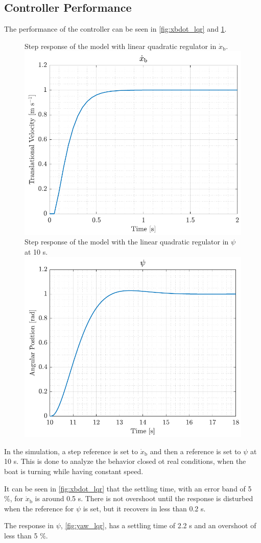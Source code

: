 \subsection{Controller Performance}
The performance of the controller can be seen in \autoref{fig:xbdot_lqr} and \ref{fig:yaw_lqr}. 
\begin{figure}[H]
    \captionbox 
    {   
        Step response of the model with linear quadratic regulator in $\dot{x}_\mathrm{b}$.
        \label{fig:xbdot_lqr}
    }                                                                 
    {                                                                  
        \includegraphics[width=.45\textwidth]{figures/xbdot_lqr}         
    }                                                                    
    \hspace{5pt}                                                          
    \captionbox  
    {      
        Step response of the model with the linear quadratic regulator in $\psi$ at 10 s.
        \label{fig:yaw_lqr}
    }                                                                          
    {
        \includegraphics[width=.45\textwidth]{figures/yaw_lqr}
    }
\end{figure}
%
In the simulation, a step reference is set to $\dot{x}_\mathrm{b}$ and then a reference is set to $\psi$ at 10 s. This is done to analyze the behavior closed ot real conditions, when the boat is turning while having constant speed.

It can be seen in \autoref{fig:xbdot_lqr} that the settling time, with an error band of 5 \%, for $\dot{x}_\mathrm{b}$ is around \num{0.5} s. There is not overshoot until the response is disturbed when the reference for $\psi$ is set, but it recovers in less than \num{0.2} s.

The response in $\psi$, \autoref{fig:yaw_lqr}, has a settling time of \num{2.2} s and an overshoot of less than 5 \%.

